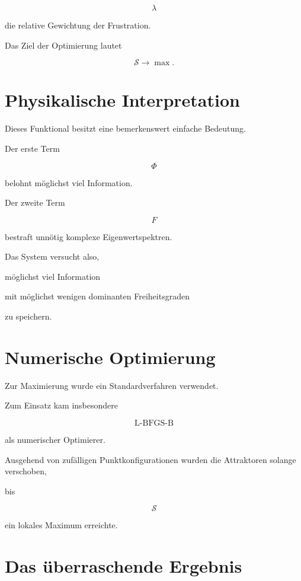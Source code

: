 \[
\lambda
\]

die relative Gewichtung der Frustration.

Das Ziel der Optimierung lautet

\[
\mathcal{S}
\rightarrow
\max.
\]


\section*{Physikalische Interpretation}

Dieses Funktional besitzt eine bemerkenswert einfache Bedeutung.

Der erste Term

\[
\Phi
\]

belohnt möglichst viel Information.

Der zweite Term

\[
F
\]

bestraft unnötig komplexe Eigenwertspektren.

Das System versucht also,

möglichst viel Information

mit möglichst wenigen dominanten Freiheitsgraden

zu speichern.


\section*{Numerische Optimierung}

Zur Maximierung wurde ein Standardverfahren verwendet.

Zum Einsatz kam insbesondere

\[
\text{L-BFGS-B}
\]

als numerischer Optimierer.

Ausgehend von zufälligen Punktkonfigurationen wurden die Attraktoren solange verschoben,

bis

\[
\mathcal{S}
\]

ein lokales Maximum erreichte.


\section*{Das überraschende Ergebnis}

